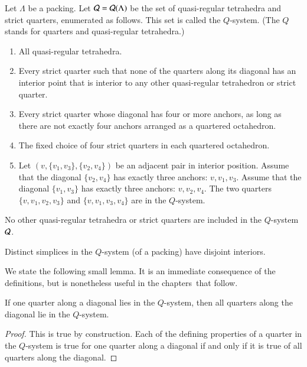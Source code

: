 \begin{definition}[$Q$-system]\label{def:q-system}  Let
$\Lambda$ be a packing. Let ${\mathcal Q}={\mathcal Q}(\Lambda)$ be the set of
quasi-regular tetrahedra and strict quarters, enumerated as
follows. This set is called the $Q$-system.  (The $Q$ stands for
quarters and quasi-regular tetrahedra.)
%


\begin{enumerate}
   \item All quasi-regular tetrahedra.
   \item Every strict quarter such that none of the quarters along
   its diagonal has an interior point that is interior to any other
   quasi-regular tetrahedron or strict quarter.
   \item Every strict quarter whose diagonal has four or more
   anchors, as long as there are not exactly four anchors arranged
   as a quartered
   octahedron.
   \item The fixed choice of four strict quarters in each
   quartered octahedron.
   \item Let $(v,\{v_1,v_3\},\{v_2,v_4\})$ be an adjacent pair in interior
   position.  Assume that the diagonal $\{v_2,v_4\}$ has exactly three anchors:
    $v,v_1,v_3$.  Assume that the diagonal $\{v_1,v_3\}$ has exactly three anchors:
    $v,v_2,v_4$.  The two quarters $\{v,v_1,v_2,v_3\}$ and $\{v,v_1,v_3,v_4\}$ are
    in the $Q$-system.
\end{enumerate}
No other quasi-regular tetrahedra or strict quarters are included
in the $Q$-system ${\mathcal Q}$.
\end{definition}


\begin{claim}\label{thm:nonoverlap}
Distinct simplices in the $Q$-system (of a %
packing) have
disjoint interiors.
\end{claim}


We state the following small lemma. It is an immediate consequence
of the definitions, but is nonetheless useful in the chapters\ that
follow.

\begin{lemma} \label{lemma:diags-engulf}
If one quarter along a diagonal lies in the $Q$-system, then all
quarters along the diagonal lie in the $Q$-system.
\end{lemma}

\begin{proof} This is true by construction.  Each of the defining properties
of a quarter in the $Q$-system is true for one quarter along a
diagonal if and only if  it is true of all quarters along the
diagonal.
\end{proof}







